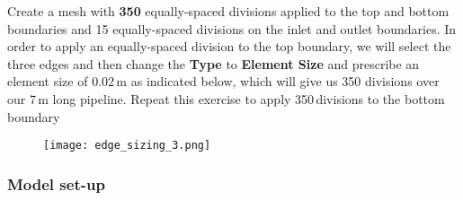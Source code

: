 \documentclass[11pt,a4paper,oneside]{scrartcl}
\newcommand\bfr[1]{\textcolor[rgb]{1,0.00,0.00}{\textbf{\textsf{#1}}}}
\begin{document}
Create a mesh with \bfr{350} equally-spaced divisions applied to the top and bottom boundaries and 15 equally-spaced divisions on the inlet and outlet boundaries. In order to apply an equally-spaced division to the top boundary, we will select the three edges and then change the \bfr{Type} to \bfr{Element Size} and prescribe an element size of 0.02\,m as indicated below, which will give us 350 divisions over our 7\,m long pipeline. Repeat this exercise to apply 350\,divisions to the bottom boundary

\begin{figure}[H]
\begin{center}
    \texttt{[image: edge\_sizing\_3.png]}
\end{center}
\end{figure}

\subsubsection*{Model set-up}
\end{document}
